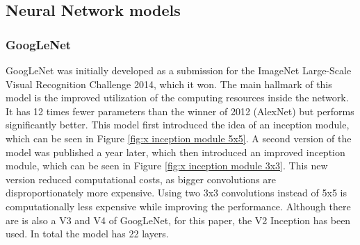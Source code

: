 \documentclass[conference]{IEEEtran}
\begin{document}
\subsection{Neural Network models}
\subsubsection{GoogLeNet}
GoogLeNet was initially developed as a submission for the ImageNet Large-Scale Visual Recognition Challenge 2014, which it won. The main hallmark of this model is the improved utilization of the computing resources inside the network. It has 12 times fewer parameters than the winner of 2012 (AlexNet) but performs significantly better. \cite{szegedy_going_2014}
This model first introduced the idea of an inception module, which can be seen in Figure \ref{fig:x inception module 5x5}.
A second version of the model was published a year later, which then introduced an improved inception module, which can be seen in Figure \ref{fig:x inception module 3x3}.
This new version reduced computational costs, as bigger convolutions are disproportionately more expensive. Using two 3x3 convolutions instead of 5x5 is computationally less expensive while improving the performance.
Although there are is also a V3 and V4 of GoogLeNet, for this paper, the V2 Inception has been used.
In total the model has 22 layers.
\end{document}
